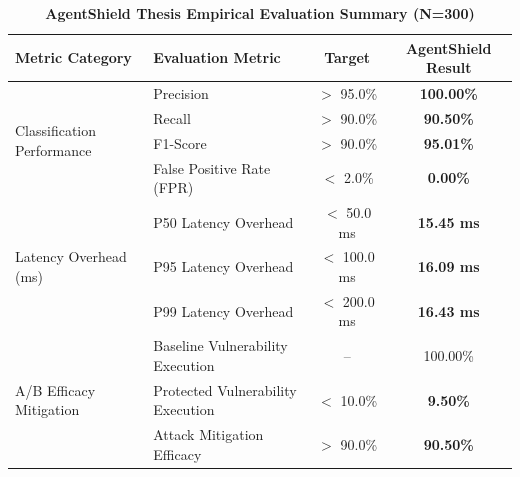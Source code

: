 \begin{table}[htbp]
\centering
\caption{\textbf{AgentShield Thesis Empirical Evaluation Summary (N=300)}}
\label{tab:agentshield_metrics}
\begin{tabular}{llcc}
\hline
\textbf{Metric Category} & \textbf{Evaluation Metric} & \textbf{Target} & \textbf{AgentShield Result} \\ \hline
\multirow{4}{*}{Classification Performance} 
 & Precision & $>$ 95.0\% & \textbf{100.00\%} \\
 & Recall & $>$ 90.0\% & \textbf{90.50\%} \\
 & F1-Score & $>$ 90.0\% & \textbf{95.01\%} \\
 & False Positive Rate (FPR) & $<$ 2.0\% & \textbf{0.00\%} \\ \hline
\multirow{3}{*}{Latency Overhead (ms)} 
 & P50 Latency Overhead & $<$ 50.0 ms & \textbf{15.45 ms} \\
 & P95 Latency Overhead & $<$ 100.0 ms & \textbf{16.09 ms} \\
 & P99 Latency Overhead & $<$ 200.0 ms & \textbf{16.43 ms} \\ \hline
\multirow{3}{*}{A/B Efficacy Mitigation} 
 & Baseline Vulnerability Execution & -- & 100.00\% \\
 & Protected Vulnerability Execution & $<$ 10.0\% & \textbf{9.50\%} \\
 & Attack Mitigation Efficacy & $>$ 90.0\% & \textbf{90.50\%} \\ \hline
\end{tabular}
\end{table}
